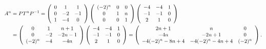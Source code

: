 {\begin{enumerate}
{\begin{align*}\ensuremath
A^n&=PT^nP^{-1}=\left(
\begin{array}{ccc}
0&1&1\\
0&-2&-1\\
1&-4&0
\end{array}
\right)\left(
 \begin{array}{ccc}
 (-2)^n&0&0\\
 0&1&n\\
 0&0&1
 \end{array}
 \right)\left(
\begin{array}{ccc}
-4&-4&1\\
-1&-1&0\\
2&1&0
\end{array}
\right)\\
 &= \left(
\begin{array}{ccc}
0&1&n+1\\
0&-2&-2n-1\\
(-2)^n&-4&-4n
\end{array}
\right)\left(
\begin{array}{ccc}
-4&-4&1\\
-1&-1&0\\
2&1&0
\end{array}
\right)=\left(
\begin{array}{ccc}
2n+1&n&0\\
-4n&-2n+1&0\\
-4(-2)^n-8n+4&-4(-2)^n-4n+4&(-2)^n
\end{array}
\right).
\end{align*}

\begin{center}
\end{center}}
\end{enumerate}
}
